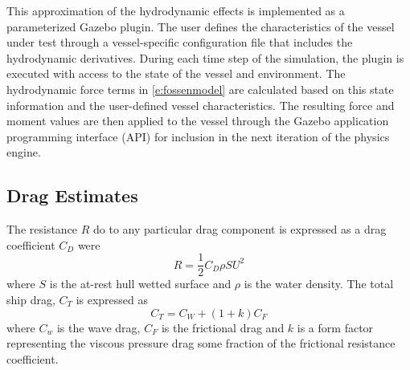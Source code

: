 \documentclass[11pt, letterpaper]{article}
\begin{document}
This approximation of the hydrodynamic effects is implemented as a parameterized Gazebo plugin.  The user defines the characteristics of the vessel under test through a vessel-specific configuration file that includes the hydrodynamic derivatives.  During each time step of the simulation, the plugin is executed with access to the state of the vessel and environment.  The hydrodynamic force terms in \eqref{e:fossenmodel} are calculated based on this state information and the user-defined vessel characteristics.  The resulting force and moment values are then applied to the vessel through the Gazebo application programming interface (API) for inclusion in the next iteration of the physics engine.


\subsection{Drag Estimates}

The resistance $R$ do to any particular drag component is expressed as a drag coefficient $C_D$ were
\[
R = \frac{1}{2}C_D \rho S U^2
\]
where $S$ is the at-rest hull wetted surface and $\rho$ is the water density. The total ship drag, $C_T$ is expressed as
\[
C_T = C_W + (1+k) C_F
\]
where $C_w$ is the wave drag, $C_F$ is the frictional drag and $k$ is a form factor representing the viscous pressure drag some fraction of the frictional resistance coefficient.
\end{document}
